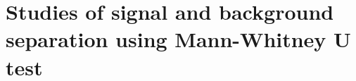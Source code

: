 \documentclass[final,1p,11pt]{elsarticle}
\begin{document}
\section{Studies of signal and background separation using Mann-Whitney U test}




\end{document}
